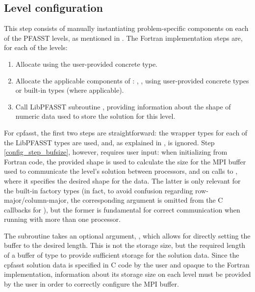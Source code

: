 \subsection{Level configuration}

This step consists of manually instantiating problem-specific components on each of the PFASST levels, as mentioned in . The Fortran implementation steps are, for each of the levels:
\begin{enumerate}
    \item Allocate  using the user-provided concrete type.
    \item Allocate the applicable components of : , ,  using user-provided concrete types or built-in types (where applicable).
    \item \label{config_step_bufsize} Call LibPFASST subroutine , providing information about the shape of numeric data used to store the solution for this level.
\end{enumerate}

For cpfasst, the first two steps are straightforward: the wrapper types for each of the LibPFASST types are used, and, as explained in ,  is ignored. Step \ref{config_step_bufsize}, however, requires user input: when initializing from Fortran code, the provided shape is used to calculate the size for the MPI buffer used to communicate the level's solution between processors, and on calls to , where it specifies the desired shape for the data. The latter is only relevant for the built-in factory types (in fact, to avoid confusion regarding row-major/column-major, the corresponding argument is omitted from the C callbacks for ), but the former is fundamental for correct communication when running with more than one processor.

The  subroutine takes an optional argument, , which allows for directly setting the buffer to the desired length. This is not the storage size, but the required length of a buffer of type  to provide sufficient storage for the solution data. Since the cpfasst solution data is specified in C code by the user and opaque to the Fortran implementation, information about its storage size on each level must be provided by the user in order to correctly configure the MPI buffer.

